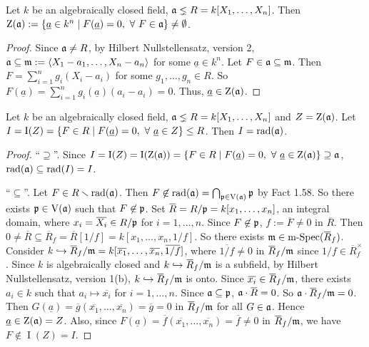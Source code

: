 \begin{theorem}\label{5.43}
    Let $k$ be an algebraically closed field, $\mathfrak{a} \lneq R = k[X_1,\ldots,X_n]$. Then $\operatorname{Z}(\mathfrak{a}) := \{\underline a \in k^{n} \mid F(\underline a) = 0, \ \forall \  F \in \mathfrak{a}\} \neq \emptyset$.
\end{theorem}

\begin{proof}
    Since $\mathfrak{a} \neq R$, by Hilbert Nullstellensatz, version 2, $\mathfrak{a} \subseteq \mathfrak{m} := \langle X_1-a_1,\ldots,X_n-a_n \rangle$ for some $\underline a \in k^{n}$. Let $F \in \mathfrak{a} \subseteq \mathfrak{m}$. Then $F = \sum_{i=1}^{n} g_i(X_i-a_i)$ for some $g_1,\ldots,g_n \in R$. So $F(\underline a) = \sum_{i=1}^{n} g_i(\underline a)(a_i - a_i) = 0$. Thus, $\underline a \in \operatorname{Z}(\mathfrak{a})$.
\end{proof}

\begin{theorem}\label{5.44}
    Let $k$ be an algebraically closed field, $\mathfrak{a} \lneq R = k[X_1,\ldots,X_n]$ and $Z = \operatorname{Z}(\mathfrak{a})$. Let $I = \operatorname{I}(Z) = \{F \in R \mid F(\underline a) = 0, \ \forall \  \underline a \in Z\} \leq R$. Then $I = \operatorname{rad}(\mathfrak{a})$.
\end{theorem}

\begin{proof}
    ``$\supseteq$''.  Since $I = \operatorname{I}(Z) = \operatorname{I}(\operatorname{Z}(\mathfrak{a})) = \{F \in R \mid F(\underline a) = 0, \ \forall \  \underline a \in \operatorname{Z}(\mathfrak{a})\} \supseteq \mathfrak{a}$, $\operatorname{rad}(\mathfrak{a}) \subseteq \operatorname{rad}(I) = I$. \par 
    ``$\subseteq$''. Let $F \in R \smallsetminus \operatorname{rad}(\mathfrak{a})$. Then $F \not \in \operatorname{rad}(\mathfrak{a}) = \bigcap_{\mathfrak{p} \in \operatorname{V}(\mathfrak{a})} \mathfrak{p}$ by Fact 1.58. So there exists $\mathfrak{p} \in \operatorname{V}(\mathfrak{a})$ such that $F \not\in \mathfrak{p}$. Set $\overbar{R} = R/\ffp = k[x_1,\ldots,x_n]$, an integral domain, where $x_i = \overbar{X_i} \in R/\ffp$ for $i = 1,\ldots,n$. Since $F \not\in \mathfrak{p}$, $f := \overbar{F} \neq 0$ in $\overbar{R}$. Then $0 \neq \overbar{R} \subseteq \overbar{R}_f = \overbar{R}[1/f] = k[x_1,\ldots,x_n,1/f]$. So there exists $\ffm \in \operatorname{m-Spec}(\overbar{R}_f)$. Consider $k \hookrightarrow \overbar{R}_f/\ffm = k[\overbar{x_1},\ldots,\overbar{x_n},\overbar{1/f}]$, where $\overbar{1/f} \neq 0$ in $\overbar{R}_f/\ffm$ since $1/f \in \overbar{R}_f^{\times}$. Since $k$ is algebraically closed and $k \hookrightarrow \overbar{R}_f/\ffm$ is a subfield, by Hilbert Nullstellensatz, version 1(b), $k \hookrightarrow \overbar{R}_f/\ffm$ is onto. Since $\overbar{x_i} \in \overbar{R}_f/\ffm$, there exists $a_i \in k$ such that $a_i \mapsto \overbar{x_i}$ for $i = 1,\ldots,n$. Since $\mathfrak{a} \subseteq \mathfrak{p}$, $\ffa \cdot \overbar{R} = 0$. So $\ffa \cdot \overbar{R}_f/\ffm = 0$. Then $G(\underline a) = \overbar{g}(\overbar{x_1},\ldots,\overbar{x_n}) = \overbar{g} = 0$ in $\overbar{R}_f/\ffm$ for all $G \in \mathfrak{a}$. Hence $\underline a \in \operatorname{Z}(\mathfrak{a}) = Z$. Also, since $F(\underline a) = \overbar{f}(\overbar{x_1},\ldots,\overbar{x_n}) = \overbar{f} \neq 0$ in $\overbar{R}_f/\ffm$, we have $F \not\in \operatorname{I}(Z) = I$.
\end{proof}
